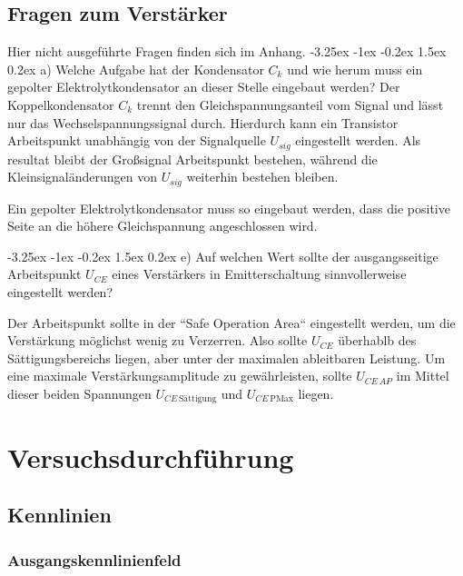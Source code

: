 \documentclass[
	a4paper, %
	12pt, %
]{CSUniSchoolLabReport}
\makeatletter
\renewcommand\paragraph{\@startsection{paragraph}{4}{\z@}%
  {-3.25ex \@plus -1ex \@minus -0.2ex}%
  {1.5ex \@plus 0.2ex}%
  {\normalfont\normalsize\bfseries}}
\makeatother
\begin{document}
\subsection{Fragen zum Verstärker}
Hier nicht ausgeführte Fragen finden sich im Anhang.
\paragraph{a) Welche Aufgabe hat der Kondensator $C_k$ und wie herum muss ein gepolter Elektrolytkondensator an dieser Stelle eingebaut werden?}
Der Koppelkondensator $C_k$ trennt den Gleichspannungsanteil vom Signal und lässt nur das Wechselspannungssignal durch.
Hierdurch kann ein Transistor Arbeitspunkt unabhängig von der Signalquelle $U_{sig}$ eingestellt werden. Als resultat bleibt der Großsignal Arbeitspunkt bestehen, während die Kleinsignaländerungen von $U_{sig}$ weiterhin bestehen bleiben. 



Ein gepolter Elektrolytkondensator muss so eingebaut werden, dass die positive Seite an die höhere Gleichspannung angeschlossen wird.


\paragraph{e) Auf welchen Wert sollte der ausgangsseitige Arbeitspunkt $U_{CE}$ eines Verstärkers in Emitterschaltung sinnvollerweise eingestellt werden? }

Der Arbeitspunkt sollte in der ``Safe Operation Area`` eingestellt werden, um die Verstärkung möglichst wenig zu Verzerren. Also sollte $U_{CE}$ überhablb des Sättigungsbereichs liegen, aber unter der maximalen ableitbaren Leistung. 
Um eine maximale Verstärkungsamplitude zu gewährleisten, sollte $U_{CE\,AP}$ im Mittel dieser beiden Spannungen $U_{CE\,\text{Sättigung}}$ und $U_{CE\,\text{PMax}}$ liegen.




\section{Versuchsdurchführung}
\subsection{Kennlinien }
\subsubsection{Ausgangskennlinienfeld}
\end{document}
